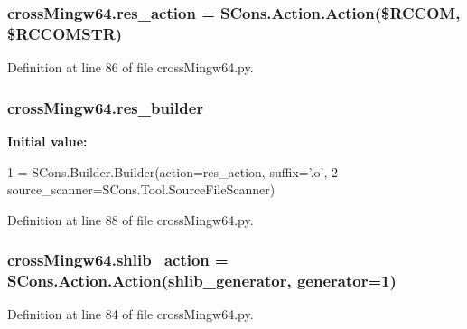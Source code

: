 \subsubsection[{\texorpdfstring{res\+\_\+action}{res_action}}]{\setlength{\rightskip}{0pt plus 5cm}cross\+Mingw64.\+res\+\_\+action = S\+Cons.\+Action.\+Action(\textquotesingle{}\$R\+C\+C\+OM\textquotesingle{}, \textquotesingle{}\$R\+C\+C\+O\+M\+S\+TR\textquotesingle{})}\hypertarget{namespacecross_mingw64_a372b7ec410450bc1869a584bc1ea2313}{}\label{namespacecross_mingw64_a372b7ec410450bc1869a584bc1ea2313}


Definition at line 86 of file cross\+Mingw64.\+py.

\subsubsection[{\texorpdfstring{res\+\_\+builder}{res_builder}}]{\setlength{\rightskip}{0pt plus 5cm}cross\+Mingw64.\+res\+\_\+builder}\hypertarget{namespacecross_mingw64_aabcfbbcefd8ba4a63f685e8982bfc1b3}{}\label{namespacecross_mingw64_aabcfbbcefd8ba4a63f685e8982bfc1b3}
{\bfseries Initial value\+:}
\begin{DoxyCode}
1 = SCons.Builder.Builder(action=res\_action, suffix=\textcolor{stringliteral}{'.o'},
2                   source\_scanner=SCons.Tool.SourceFileScanner)
\end{DoxyCode}


Definition at line 88 of file cross\+Mingw64.\+py.

\subsubsection[{\texorpdfstring{shlib\+\_\+action}{shlib_action}}]{\setlength{\rightskip}{0pt plus 5cm}cross\+Mingw64.\+shlib\+\_\+action = S\+Cons.\+Action.\+Action({\bf shlib\+\_\+generator}, generator=1)}\hypertarget{namespacecross_mingw64_ac946b6b5bf9df0ad25ea41778a113f10}{}\label{namespacecross_mingw64_ac946b6b5bf9df0ad25ea41778a113f10}


Definition at line 84 of file cross\+Mingw64.\+py.

